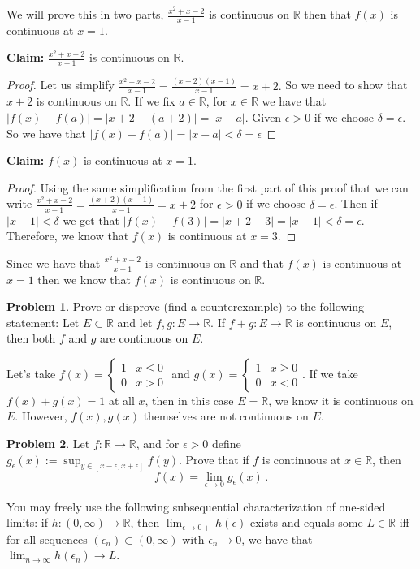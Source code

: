\documentclass[11pt]{article}
\theoremstyle{definition}
\newtheorem{problem}{Problem}
\newcommand{\R}{\mathbb{R}}
\newcommand{\e}{\epsilon}
\begin{document}
We will prove this in two parts, $\frac{x^2+x-2}{x-1}$ is continuous on $\R$ then that $f(x)$ is continuous at $x = 1$.

\textbf{Claim: } $\frac{x^2+x-2}{x-1}$ is continuous on $\R$.
\begin{proof}
Let us simplify $\frac{x^2+x-2}{x-1} = \frac{(x+2)(x-1)}{x-1} = x+2.$ So we need to show that $x+2$ is continuous on $\R$. If we fix $a\in \R$, for $x\in \R$ we have that $|f(x)-f(a)| = |x+2-(a+2)| = |x-a|$. Given $\epsilon > 0$ if we choose $\delta = \epsilon.$ So we have that $|f(x) - f(a)| = |x - a| < \delta = \epsilon$
\end{proof}
\textbf{Claim:} $f(x)$ is continuous at $x=1.$
\begin{proof}
Using the same simplification from the first part of this proof that we can write $\frac{x^2+x-2}{x-1} = \frac{(x+2)(x-1)}{x-1} = x+2$ for $\epsilon > 0$ if we choose $\delta = \epsilon$. Then if $|x - 1| < \delta$ we get that $|f(x) - f(3)| = |x + 2 - 3| = |x - 1| < \delta = \epsilon.$ Therefore, we know that $f(x)$ is continuous at $x = 3.$
\end{proof} Since we have that $\frac{x^2+x-2}{x-1}$ is continuous on $\R$ and that $f(x)$ is continuous at $x = 1$ then we know that $f(x)$ is continuous on $\R.$

\newpage
\begin{problem}
Prove or disprove (find a counterexample) to the following statement: Let $E \subset \R$ and let $f, g : E \to \R$. If $f + g : E \to \R$ is continuous on $E$, then both $f$ and $g$ are continuous on $E$. 
\end{problem}

Let's take $f(x) = \begin{cases}
1 & x \leq 0\\
0 & x > 0
\end{cases}$ and $g(x) = \begin{cases}
1 & x \geq 0\\
0 & x < 0
\end{cases}$. If we take $f(x) + g(x) = 1$ at all $x$, then in this case $E = \R$, we know it is continuous on $E.$ However, $f(x), g(x)$ themselves are not continuous on $E.$

\newpage
\begin{problem}
Let $f : \R \to \R$, and for $\epsilon >0$ define 
$g_\epsilon(x) := \sup_{y \in [x - \e, x + \e]} f(y)$. Prove that
if $f$ is continuous at $x \in \R$, then 
\[
f(x) = \lim_{\epsilon \to 0} g_\epsilon(x) \,. 
\]

You may freely use the following subsequential characterization of one-sided limits: if $h : (0, \infty) \to \R$, then $\lim_{\epsilon \to 0+} h(\epsilon)$ exists and equals some $L \in \R$ iff for all sequences $(\epsilon_n) \subset (0,\infty)$ with $\epsilon_n \to 0$, we have that $\lim_{n \to \infty} h(\epsilon_n) \to L$. 
\end{problem}
\end{document}
